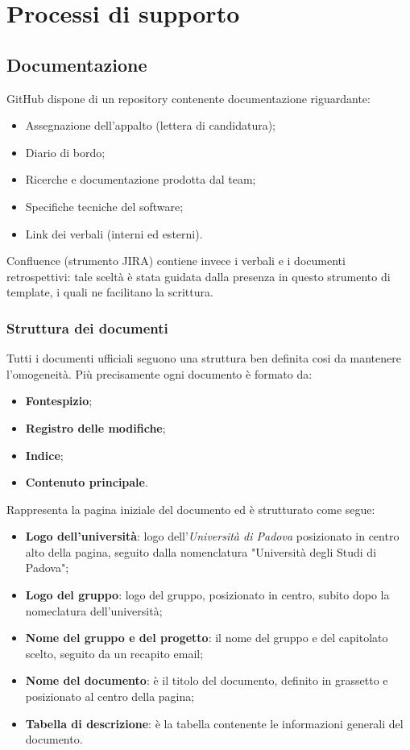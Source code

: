 \section{Processi di supporto}

\subsection{Documentazione}
GitHub dispone di un repository contenente documentazione riguardante:
\begin{itemize}
    \item Assegnazione dell'appalto (lettera di candidatura);
    \item Diario di bordo;
    \item Ricerche e documentazione prodotta dal team;
    \item Specifiche tecniche del software;
    \item Link dei verbali (interni ed esterni).
\end{itemize}
Confluence (strumento JIRA) contiene invece i verbali e i documenti retrospettivi: tale sceltà è stata guidata dalla presenza in questo strumento di template, i quali ne facilitano la scrittura.

\subsubsection{Struttura dei documenti}
Tutti i documenti ufficiali seguono una struttura ben definita cosi da mantenere l'omogeneità. Più precisamente ogni documento è formato da:
\begin{itemize}
    \item \textbf{Fontespizio};
    \item \textbf{Registro delle modifiche};
    \item \textbf{Indice};
    \item \textbf{Contenuto principale}.
\end{itemize}
	
Rappresenta la pagina iniziale del documento ed è strutturato come segue:
\begin{itemize}
    \item \textbf{Logo dell'università}: logo dell'\textit{Università di Padova} posizionato in centro alto della pagina, seguito dalla nomenclatura "Università degli  Studi di Padova";
    \item \textbf{Logo del gruppo}: logo del gruppo, posizionato in centro, subito dopo la nomeclatura dell'università;
    \item \textbf{Nome del gruppo e del progetto}: il nome del gruppo e del capitolato scelto, seguito da un recapito email;
    \item \textbf{Nome del documento}: è il titolo del documento, definito in grassetto e posizionato al centro della pagina;
    \item \textbf{Tabella di descrizione}: è la tabella contenente le informazioni generali del documento.
\end{itemize}

